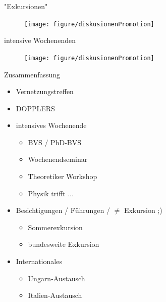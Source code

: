 \documentclass[
]{beamer}
\begin{document}
\begin{frame}{"Exkursionen"}
  \begin{figure}
   \centering
   \texttt{[image: figure/diskusionenPromotion]}
  \end{figure}
\end{frame}

\begin{frame}{intensive Wochenenden}
  \begin{figure}
   \centering
   \texttt{[image: figure/diskusionenPromotion]}
  \end{figure}
\end{frame}

\begin{frame}{Zusammenfassung}
  \begin{itemize}
    \item Vernetzungstreffen
    \item DOPPLERS
    \item intensives Wochenende
    \begin{itemize}
      \item BVS / PhD-BVS
      \item Wochenendseminar
      \item Theoretiker Workshop
      \item Physik trifft ...
    \end{itemize}
    \item Besichtigungen / Führungen / $\neq$ Exkursion ;)
    \begin{itemize}
      \item Sommerexkursion
      \item bundesweite Exkursion
    \end{itemize}
    \item Internationales
    \begin{itemize}
      \item Ungarn-Austausch
      \item Italien-Austausch
    \end{itemize}
  \end{itemize}
\end{frame}
\end{document}
